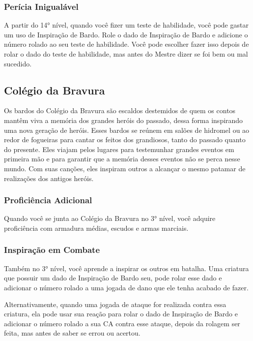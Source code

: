 \begin{multicols}{2}
\subsubsection*{Perícia Inigualável}%

A partir do 14° nível, quando você fizer um teste de habilidade, você pode
gastar um uso de Inspiração de Bardo. Role o dado de Inspiração de Bardo e
adicione o número rolado ao seu teste de habilidade. Você pode escolher fazer
isso depois de rolar o dado do teste de habilidade, mas antes do Mestre dizer se
foi bem ou mal sucedido.

\subsection*{Colégio da Bravura}%

Os bardos do Colégio da Bravura são escaldos destemidos de quem os contos mantêm
viva a memória dos grandes heróis do passado, dessa forma inspirando uma nova
geração de heróis. Esses bardos se reúnem em salões de hidromel ou ao redor de
fogueiras para cantar os feitos dos grandiosos, tanto do passado quanto do
presente. Eles viajam pelos lugares para testemunhar grandes eventos em primeira
mão e para garantir que a memória desses eventos não se perca nesse mundo. Com
suas canções, eles inspiram outros a alcançar o mesmo patamar de realizações dos
antigos heróis.

\subsubsection{Proficiência Adicional}%

Quando você se junta ao Colégio da Bravura no 3° nível, você adquire
proficiência com armadura médias, escudos e armas marciais.

\subsubsection{Inspiração em Combate}%

Também no 3° nível, você aprende a inspirar os outros em batalha. Uma criatura
que possuir um dado de Inspiração de Bardo seu, pode rolar esse dado e adicionar
o número rolado a uma jogada de dano que ele tenha acabado de fazer.

Alternativamente, quando uma jogada de ataque for realizada contra essa
criatura, ela pode usar sua reação para rolar o dado de Inspiração de Bardo e
adicionar o número rolado a sua CA contra esse ataque, depois da rolagem ser
feita, mas antes de saber se errou ou acertou.


\end{multicols}
